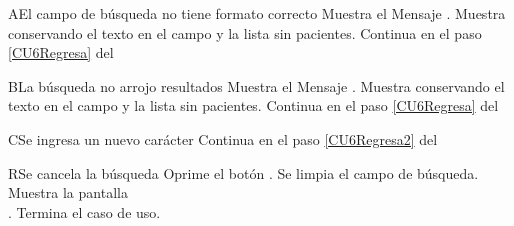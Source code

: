 
\begin{UCtrayectoriaA}{A}{El campo de búsqueda no tiene formato correcto}
    \UCpaso Muestra el Mensaje \textbf{}.
    \UCpaso Muestra  conservando el texto en el campo y la lista sin pacientes.
	\UCpaso Continua en el paso \ref{CU6Regresa} del 
\end{UCtrayectoriaA}
		
\begin{UCtrayectoriaA}{B}{La búsqueda no arrojo resultados}
    \UCpaso Muestra el Mensaje \textbf{}.
    \UCpaso Muestra  conservando el texto en el campo y la lista sin pacientes.
	\UCpaso Continua en el paso \ref{CU6Regresa} del 	
\end{UCtrayectoriaA}

\begin{UCtrayectoriaA}{C}{Se ingresa un nuevo carácter}
    \UCpaso Continua en el paso \ref{CU6Regresa2} del 
\end{UCtrayectoriaA}

\begin{UCtrayectoriaA}{R}{Se cancela la búsqueda}
	\UCpaso[\UCactor] Oprime el botón .
	\UCpaso Se limpia el campo de búsqueda.
	\UCpaso Muestra la pantalla \\.
	\UCpaso Termina el caso de uso.
\end{UCtrayectoriaA}
